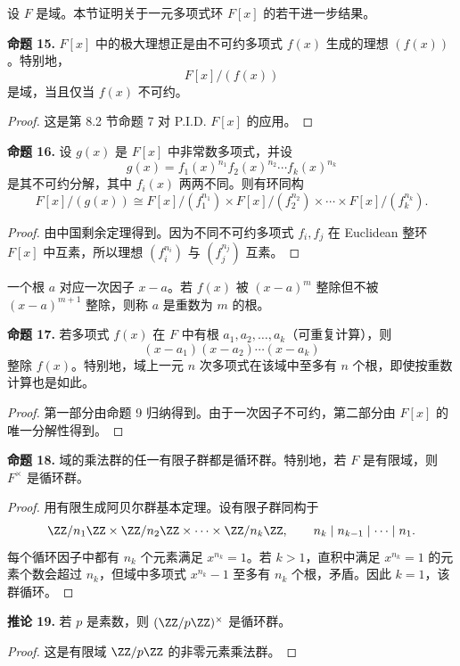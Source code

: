 设 $F$ 是域。本节证明关于一元多项式环 $F[x]$ 的若干进一步结果。

\noindent\textbf{命题 15.} $F[x]$ 中的极大理想正是由不可约多项式 $f(x)$ 生成的理想 $(f(x))$。特别地，
\[
F[x]/(f(x))
\]
是域，当且仅当 $f(x)$ 不可约。

\begin{proof}
	这是第 8.2 节命题 7 对 P.I.D. $F[x]$ 的应用。
\end{proof}

\noindent\textbf{命题 16.} 设 $g(x)$ 是 $F[x]$ 中非常数多项式，并设
\[
g(x)=f_1(x)^{n_1}f_2(x)^{n_2}\cdots f_k(x)^{n_k}
\]
是其不可约分解，其中 $f_i(x)$ 两两不同。则有环同构
\[
F[x]/(g(x))
\cong
F[x]/(f_1^{n_1})\times F[x]/(f_2^{n_2})\times\cdots\times F[x]/(f_k^{n_k}).
\]

\begin{proof}
	由中国剩余定理得到。因为不同不可约多项式 $f_i,f_j$ 在 Euclidean 整环 $F[x]$ 中互素，所以理想 $(f_i^{n_i})$ 与 $(f_j^{n_j})$ 互素。
\end{proof}

一个根 $a$ 对应一次因子 $x-a$。若 $f(x)$ 被 $(x-a)^m$ 整除但不被 $(x-a)^{m+1}$ 整除，则称 $a$ 是重数为 $m$ 的根。

\noindent\textbf{命题 17.} 若多项式 $f(x)$ 在 $F$ 中有根 $a_1,a_2,\ldots,a_k$（可重复计算），则
\[
(x-a_1)(x-a_2)\cdots(x-a_k)
\]
整除 $f(x)$。特别地，域上一元 $n$ 次多项式在该域中至多有 $n$ 个根，即使按重数计算也是如此。

\begin{proof}
	第一部分由命题 9 归纳得到。由于一次因子不可约，第二部分由 $F[x]$ 的唯一分解性得到。
\end{proof}

\noindent\textbf{命题 18.} 域的乘法群的任一有限子群都是循环群。特别地，若 $F$ 是有限域，则 $F^\times$ 是循环群。

\begin{proof}
	用有限生成阿贝尔群基本定理。设有限子群同构于
	\[
	\ZZ/n_1\ZZ\times\ZZ/n_2\ZZ\times\cdots\times\ZZ/n_k\ZZ,
	\qquad n_k\mid n_{k-1}\mid\cdots\mid n_1.
	\]
	每个循环因子中都有 $n_k$ 个元素满足 $x^{n_k}=1$。若 $k>1$，直积中满足 $x^{n_k}=1$ 的元素个数会超过 $n_k$，但域中多项式 $x^{n_k}-1$ 至多有 $n_k$ 个根，矛盾。因此 $k=1$，该群循环。
\end{proof}

\noindent\textbf{推论 19.} 若 $p$ 是素数，则 $(\ZZ/p\ZZ)^\times$ 是循环群。

\begin{proof}
	这是有限域 $\ZZ/p\ZZ$ 的非零元素乘法群。
\end{proof}

